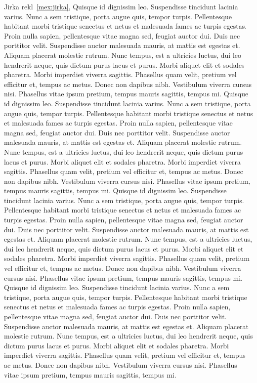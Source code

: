 
Jirka rekl~\ref{mex:jirka},
Quisque id dignissim leo. Suspendisse tincidunt lacinia varius. Nunc a sem tristique, porta augue quis, tempor turpis. Pellentesque habitant morbi tristique senectus et netus et malesuada fames ac turpis egestas. Proin nulla sapien, pellentesque vitae magna sed, feugiat auctor dui. Duis nec porttitor velit. Suspendisse auctor malesuada mauris, at mattis est egestas et. Aliquam placerat molestie rutrum. Nunc tempus, est a ultricies luctus, dui leo hendrerit neque, quis dictum purus lacus et purus. Morbi aliquet elit et sodales pharetra. Morbi imperdiet viverra sagittis. Phasellus quam velit, pretium vel efficitur et, tempus ac metus. Donec non dapibus nibh. Vestibulum viverra cursus nisi. Phasellus vitae ipsum pretium, tempus mauris sagittis, tempus mi.
Quisque id dignissim leo. Suspendisse tincidunt lacinia varius. Nunc a sem tristique, porta augue quis, tempor turpis. Pellentesque habitant morbi tristique senectus et netus et malesuada fames ac turpis egestas. Proin nulla sapien, pellentesque vitae magna sed, feugiat auctor dui. Duis nec porttitor velit. Suspendisse auctor malesuada mauris, at mattis est egestas et. Aliquam placerat molestie rutrum. Nunc tempus, est a ultricies luctus, dui leo hendrerit neque, quis dictum purus lacus et purus. Morbi aliquet elit et sodales pharetra. Morbi imperdiet viverra sagittis. Phasellus quam velit, pretium vel efficitur et, tempus ac metus. Donec non dapibus nibh. Vestibulum viverra cursus nisi. Phasellus vitae ipsum pretium, tempus mauris sagittis, tempus mi.
Quisque id dignissim leo. Suspendisse tincidunt lacinia varius. Nunc a sem tristique, porta augue quis, tempor turpis. Pellentesque habitant morbi tristique senectus et netus et malesuada fames ac turpis egestas. Proin nulla sapien, pellentesque vitae magna sed, feugiat auctor dui. Duis nec porttitor velit. Suspendisse auctor malesuada mauris, at mattis est egestas et. Aliquam placerat molestie rutrum. Nunc tempus, est a ultricies luctus, dui leo hendrerit neque, quis dictum purus lacus et purus. Morbi aliquet elit et sodales pharetra. Morbi imperdiet viverra sagittis. Phasellus quam velit, pretium vel efficitur et, tempus ac metus. Donec non dapibus nibh. Vestibulum viverra cursus nisi. Phasellus vitae ipsum pretium, tempus mauris sagittis, tempus mi.
Quisque id dignissim leo. Suspendisse tincidunt lacinia varius. Nunc a sem tristique, porta augue quis, tempor turpis. Pellentesque habitant morbi tristique senectus et netus et malesuada fames ac turpis egestas. Proin nulla sapien, pellentesque vitae magna sed, feugiat auctor dui. Duis nec porttitor velit. Suspendisse auctor malesuada mauris, at mattis est egestas et. Aliquam placerat molestie rutrum. Nunc tempus, est a ultricies luctus, dui leo hendrerit neque, quis dictum purus lacus et purus. Morbi aliquet elit et sodales pharetra. Morbi imperdiet viverra sagittis. Phasellus quam velit, pretium vel efficitur et, tempus ac metus. Donec non dapibus nibh. Vestibulum viverra cursus nisi. Phasellus vitae ipsum pretium, tempus mauris sagittis, tempus mi.
